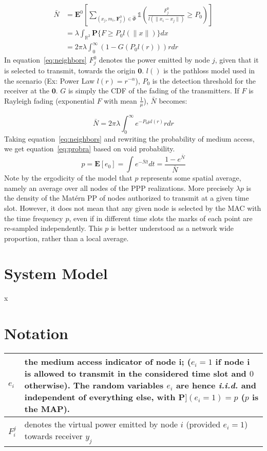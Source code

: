\documentclass[a4paper]{article}
\begin{document}
%
\begin{equation}\label{eq:neighbors}
  \begin{split}
  \bar{N} &= \textbf{E}^0[\sum_{(x_j,m_i,\textbf{F}_j^0)\in\hat{\Phi}}\mathbb{1}(\frac{F_j^0}{l(\|x_i-x_j\|)}\geq P_0)] \\
  &= \lambda\int_{\mathbb{R}^2} \textbf{P}\{F\geq P_0l(\|x\|) \}dx \\
  &= 2\pi \lambda \int_0^\infty (1-G(P_0l(r)))rdr
\end{split}
\end{equation}
%
In equation~\eqref{eq:neighbors} $F_j^0$ denotes the power emitted by node $j$, given that it is selected to transmit, towards the origin $\textbf{0}$.  $l()$ is the pathloss model used in the scenario (Ex: Power Law $l(r)=r^{-\alpha}$),  $P_0$ is the detection threshold for the receiver at the $\textbf{0}$.  $G$ is simply the CDF of the fading of the transmitters.  If $F$ is Rayleigh fading (exponential $F$ with mean $\frac{1}{\mu}$), $\bar{N}$ becomes:\par
%
\begin{equation}
  \bar{N} = 2 \pi \lambda \int_0^\infty  e^{-P_0 \mu l(r)} r dr
\end{equation}
%
Taking equation~\eqref{eq:neighbors} and rewriting the probability of medium access, we get equation~\eqref{eq:probra} based on void probability.
%
\begin{equation}\label{eq:probra}
  p = \textbf{E}[e_0] = \int e^{-\bar{N}t} dt= \frac{1-e^{\bar{N}}}{\bar{N}}
\end{equation}
%
Note by the ergodicity of the model that $p$ represents some spatial average, namely an average over all nodes of the PPP realizations. More precisely $\lambda p$ is the density of the Mat\'ern PP of nodes authorized to transmit at a given time slot. However, it does not mean that any given
node is selected by the MAC with the time frequency $p$, even if in different time slots the marks of each point are re-sampled independently.  This $p$ is better understood as a network wide proportion, rather than a local average.



\section{System Model}
x

\section{Notation}
%
\begin{tabular}{ l | p{10cm} }
  $e_i$ & the medium access indicator of node i; ($e_i = 1$ if node i is allowed to transmit in the considered time slot and $0$ otherwise). The random variables $e_i$ are hence \textit{i.i.d.} and independent of everything else, with $\textbf{P}](e_i = 1) = p$ ($p$ is the MAP). \\
  \hline
  $F_i^j$ & denotes the virtual power emitted by node $i$ (provided $e_i = 1$) towards receiver $y_j$ \\
  \hline
\end{tabular}

%

%

%
\end{document}
